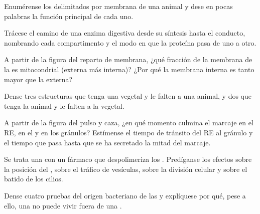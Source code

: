 \begin{exercise}[$\star$]\label{exo:b1:eukaryotic-cell:1}
Enumérense los  delimitados por membrana de una  animal y
dese en pocas palabras la función principal de cada uno.
\end{exercise}

\begin{exercise}[$\star$]\label{exo:b1:eukaryotic-cell:2}
Trácese el camino de una enzima digestiva desde su síntesis hasta el
conducto, nombrando cada compartimento y el modo en que la proteína pasa de
uno a otro.
\end{exercise}

\begin{exercise}[$\star$]\label{exo:b1:eukaryotic-cell:3}
A partir de la figura del reparto de membrana, ¿qué fracción de la membrana
de la  es mitocondrial (externa más interna)? ¿Por qué la membrana
interna es tanto mayor que la externa?
\end{exercise}

\begin{exercise}[$\star$]\label{exo:b1:eukaryotic-cell:4}
Dense tres estructuras que tenga una  vegetal y le falten a una animal,
y dos que tenga la animal y le falten a la vegetal.
\end{exercise}

\begin{exercise}[$\star\star$]\label{exo:b1:eukaryotic-cell:5}
A partir de la figura del pulso y caza, ¿en qué momento culmina el marcaje
en el RE, en el  y en los gránulos? Estímense el tiempo de tránsito del
RE al gránulo y el tiempo que pasa hasta que se ha secretado la mitad del
marcaje.
\end{exercise}

\begin{exercise}[$\star\star$]\label{exo:b1:eukaryotic-cell:6}
Se trata una  con un fármaco que despolimeriza los .
Predíganse los efectos sobre la posición del , sobre el tráfico de
vesículas, sobre la división celular y sobre el batido de los cilios.
\end{exercise}

\begin{exercise}[$\star\star$]\label{exo:b1:eukaryotic-cell:7}
Dense cuatro pruebas del origen bacteriano de las  y explíquese
por qué, pese a ello, una  no puede vivir fuera de una .
\end{exercise}

